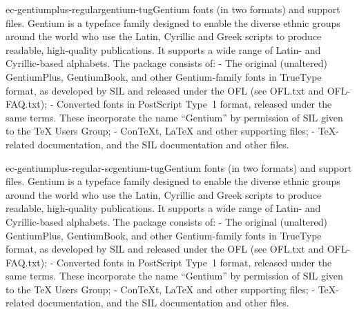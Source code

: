 \documentclass{ddltxtyp}
\begin{document}
\begin{package}{ec-gentiumplus-regular}{gentium-tug}{Gentium fonts (in two formats) and support files.}
Gentium is a typeface family designed to enable the diverse
ethnic groups around the world who use the Latin, Cyrillic and
Greek scripts to produce readable, high-quality publications.
It supports a wide range of Latin- and Cyrillic-based
alphabets. The package consists of: - The original (unaltered)
GentiumPlus, GentiumBook, and other Gentium-family fonts in
TrueType format, as developed by SIL and released under the OFL
(see OFL.txt and OFL-FAQ.txt); - Converted fonts in PostScript
Type~1 format, released under the same terms. These incorporate
the name ``Gentium'' by permission of SIL given to the {\TeX} Users
Group; - ConTeXt, {\LaTeX} and other supporting files; - {\TeX}-
related documentation, and the SIL documentation and other
files.
\end{package}
\begin{package}{ec-gentiumplus-regular-sc}{gentium-tug}{Gentium fonts (in two formats) and support files.}
Gentium is a typeface family designed to enable the diverse
ethnic groups around the world who use the Latin, Cyrillic and
Greek scripts to produce readable, high-quality publications.
It supports a wide range of Latin- and Cyrillic-based
alphabets. The package consists of: - The original (unaltered)
GentiumPlus, GentiumBook, and other Gentium-family fonts in
TrueType format, as developed by SIL and released under the OFL
(see OFL.txt and OFL-FAQ.txt); - Converted fonts in PostScript
Type~1 format, released under the same terms. These incorporate
the name ``Gentium'' by permission of SIL given to the {\TeX} Users
Group; - ConTeXt, {\LaTeX} and other supporting files; - {\TeX}-
related documentation, and the SIL documentation and other
files.
\end{package}
\end{document}
